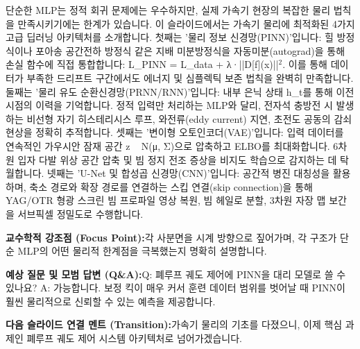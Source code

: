 \documentclass[11pt,a4paper]{article}
\begin{document}
\begin{tcolorbox}[colback=white,colframe=primaryblue,title={\footnotesize\bfseries\color{white}발표자 구두 대본 (Spoken Script)},fontupper=\small,left=6pt,right=6pt,top=3pt,bottom=3pt,boxrule=0.8pt,arc=2.5pt]
단순한 MLP는 정적 회귀 문제에는 우수하지만, 실제 가속기 현장의 복잡한 물리 법칙을 만족시키기에는 한계가 있습니다. 이 슬라이드에서는 가속기 물리에 최적화된 4가지 고급 딥러닝 아키텍처를 소개합니다. 첫째는 '물리 정보 신경망(PINN)'입니다: 힐 방정식이나 포아송 공간전하 방정식 같은 지배 미분방정식을 자동미분(autograd)을 통해 손실 함수에 직접 통합합니다: L\_PINN = L\_data + λ·||D[f](x)||$^2$. 이를 통해 데이터가 부족한 드리프트 구간에서도 에너지 및 심플렉틱 보존 법칙을 완벽히 만족합니다. 둘째는 '물리 유도 순환신경망(PRNN/RNN)'입니다: 내부 은닉 상태 h\_t를 통해 이전 시점의 이력을 기억합니다. 정적 입력만 처리하는 MLP와 달리, 전자석 충방전 시 발생하는 비선형 자기 히스테리시스 루프, 와전류(eddy current) 지연, 초전도 공동의 감쇠 현상을 정확히 추적합니다. 셋째는 '변이형 오토인코더(VAE)'입니다: 입력 데이터를 연속적인 가우시안 잠재 공간 z ~ N(μ, Σ)으로 압축하고 ELBO를 최대화합니다. 6차원 입자 다발 위상 공간 압축 및 빔 정지 전조 증상을 비지도 학습으로 감지하는 데 탁월합니다. 넷째는 'U-Net 및 합성곱 신경망(CNN)'입니다: 공간적 병진 대칭성을 활용하며, 축소 경로와 확장 경로를 연결하는 스킵 연결(skip connection)을 통해 YAG/OTR 형광 스크린 빔 프로파일 영상 복원, 빔 헤일로 분할, 3차원 자장 맵 보간을 서브픽셀 정밀도로 수행합니다.
\end{tcolorbox}
\vspace{0.2em}
\begin{tcolorbox}[colback=lightbg,colframe=bordergray,left=6pt,right=6pt,top=3pt,bottom=3pt,boxrule=0.6pt,arc=2.5pt]
\small
\noindent\textbf{\color{navy}교수학적 강조점 (Focus Point):}\enspace 각 사분면을 시계 방향으로 짚어가며, 각 구조가 단순 MLP의 어떤 물리적 한계점을 극복했는지 명확히 설명합니다.\par\vspace{0.3em}
\noindent\textbf{\color{successgreen}예상 질문 및 모범 답변 (Q\&A):}\enspace Q: 폐루프 궤도 제어에 PINN을 대리 모델로 쓸 수 있나요? A: 가능합니다. 보정 킥이 매우 커서 훈련 데이터 범위를 벗어날 때 PINN이 훨씬 물리적으로 신뢰할 수 있는 예측을 제공합니다.\par\vspace{0.3em}
\noindent\textbf{\color{accent}다음 슬라이드 연결 멘트 (Transition):}\enspace 가속기 물리의 기초를 다졌으니, 이제 핵심 과제인 폐루프 궤도 제어 시스템 아키텍처로 넘어가겠습니다.
\end{tcolorbox}
\end{document}
